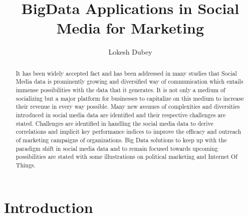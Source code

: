 \documentclass[sigconf]{acmart}
\begin{document}
\title{BigData Applications in Social Media for Marketing}


\author{Lokesh Dubey}

\renewcommand{\shortauthors}{L. Dubey}


\begin{abstract}
It has been widely accepted fact and has been addressed in many studies that Social Media data is prominently growing and diversified way of communication which entails immense possibilities with the data that it generates. It is not only a medium of socializing but a major platform for businesses to capitalize on this medium to increase their revenue in every way possible. Many new avenues of complexities and diversities introduced in social media data are identified and their respective challenges are stated. Challenges are identified in handling the social media data to derive correlations and implicit key performance indices to improve the efficacy and outreach of marketing campaigns of organizations. Big Data solutions to keep up with the paradigm shift in social media data and to remain focused towards upcoming possibilities are stated with some illustrations on political marketing and Internet Of Things.
\end{abstract}



\maketitle



\section{Introduction}
\end{document}
